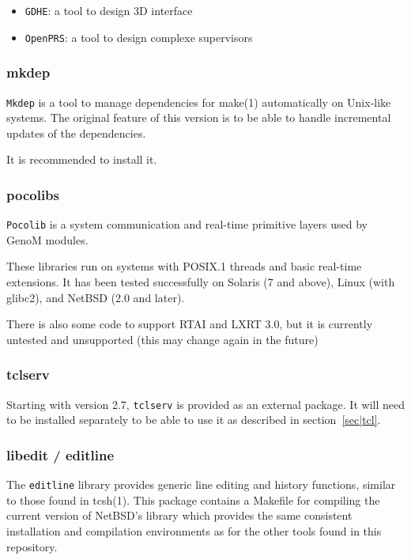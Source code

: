 \begin{itemize}
\item \texttt{GDHE}: a tool to design 3D interface
\item \texttt{OpenPRS}: a tool to design complexe supervisors
\end{itemize}

\subsubsection{mkdep}

\texttt{Mkdep} is a tool to manage dependencies for make(1) automatically on
Unix-like systems.  The original feature of this version is to be able to
handle incremental updates of the dependencies.

It is recommended to install it.

\subsubsection{pocolibs}

\texttt{Pocolib} is a system communication and real-time primitive layers used by
GenoM modules. 

These libraries run on systems with POSIX.1 threads and basic real-time
extensions. It has been tested successfully on Solaris (7 and above),
Linux (with glibc2), and NetBSD (2.0 and later). 

There is also some code to support RTAI and LXRT 3.0, but it is currently
untested and unsupported (this may change again in the future) 

\subsubsection{tclserv}

Starting with \GenoM{} version 2.7, \texttt{tclserv} is provided as an
external package. It will need to be installed separately to be able
to use it as described in section~\ref{sec|tcl}.

\subsubsection{libedit / editline}

The \texttt{editline} library provides generic line editing and history
functions, similar to those found in tcsh(1). This package contains a
Makefile for compiling the current version of NetBSD's library which
provides the same consistent installation and compilation environments as
for the other tools found in this repository. 

